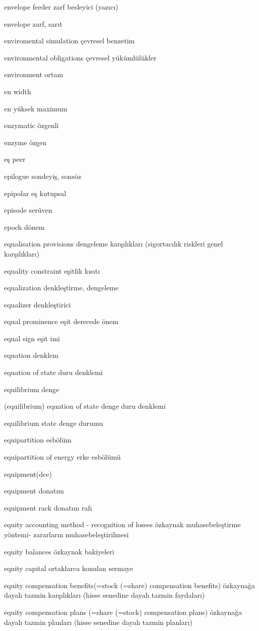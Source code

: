 \documentclass[12pt,fleqn]{article}\usepackage{../../common}
\begin{document}
envelope feeder zarf besleyici (yazıcı)

envelope zarf, sarıt

enviromental simulation çevresel benzetim

environmental obligations çevresel yükümlülükler

environment ortam

en width

en yüksek maximum

enzymatic özgenli

enzyme özgen

eş peer

epilogue sondeyiş, sonsöz

epipolar eş kutupsal

episode serüven

epoch dönem

equalisation provisions dengeleme karşılıkları (sigortacılık riskleri genel karşılıkları)

equality constraint eşitlik kısıtı

equalization denkleştirme, dengeleme

equalizer denkleştirici

equal prominence eşit derecede önem

equal sign eşit imi

equation denklem

equation of state duru denklemi

equilibrium denge

(equilibrium) equation of state denge duru denklemi

equilibrium state denge durumu

equipartition esbölüm

equipartition of energy erke esbölümü

equipment(dce)

equipment donatım

equipment rack donatım rafı

equity accounting method - recognition of losses özkaynak muhasebeleştirme yöntemi- zararların muhasebeleştirilmesi

equity balances özkaynak bakiyeleri

equity capital ortaklarca konulan sermaye

equity compensation benefits(=stock (=share) compensation benefits) özkaynağa dayalı tazmin karşılıkları (hisse senedine dayalı tazmin faydaları)

equity compensation plans (=share (=stock) compensation plans) özkaynağa dayalı tazmin planları (hisse senedine dayalı tazmin planları)
\end{document}
